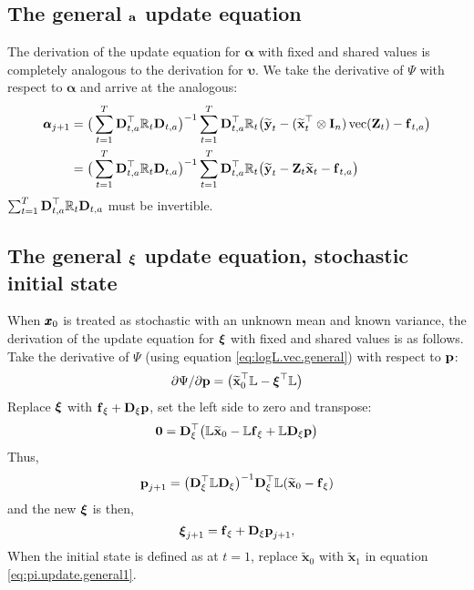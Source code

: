 \documentclass[]{article}
\def\uupsilon{\pmb{\upsilon}}
\def\aalpha{\pmb{\alpha}}
\def\xixi{\mbox{\boldmath $\xi$}}
\def\LAMm{\mathbb{L}}
\def\XI{\mbox{\boldmath $\Xi$}}
\def\DD{\mbox{$\mathbf D$}}	\def\dd{\mbox{$\mathbf d$}}
\def\II{\mbox{$\mathbf I$}} \def\ii{\mbox{$\mathbf i$}}
\def\ZZ{\mbox{$\mathbf Z$}}	\def\zz{\mbox{$\mathbf z$}}	\def\Zb{\mbox{$\mathbf M$}} \def\Za{\mbox{$\mathbf N$}} \def\Zm{\XI}
\def\vec{\,\textup{\textrm{vec}}}
\def\hatxt{\widetilde{\mbox{$\mathbf x$}}_t}
\def\hatyt{\widetilde{\mbox{$\mathbf y$}}_t}
\begin{document}
\subsection{The general $\aa$ update equation}\label{sec:constA}
The derivation of the update equation for $\aalpha$ with fixed and shared values is completely analogous to the derivation for $\uupsilon$. We take the derivative of $\Psi$ with respect to $\aalpha$ and arrive at the analogous:
\begin{equation}\label{eq:general.a.update}
\begin{split}
\aalpha_{j+1} &= \big(\sum_{t=1}^T \DD_{t,a}^\top\Rm_t\DD_{t,a} \big)^{-1}
  \sum_{t=1}^T \DD_{t,a}^\top\Rm_t\big(\hatyt- (\hatxt^\top \otimes \II_n)\vec(\ZZ_t) - \ff_{t,a} \big) \\
  &= \big(\sum_{t=1}^T \DD_{t,a}^\top\Rm_t\DD_{t,a} \big)^{-1}
  \sum_{t=1}^T \DD_{t,a}^\top\Rm_t\big(\hatyt- \ZZ_t\hatxt - \ff_{t,a} \big)
\end{split}
\end{equation}
$\sum_{t=1}^T \DD_{t,a}^\top\Rm_t\DD_{t,a}$ must be invertible.

\subsection{The general $\xixi$ update equation, stochastic initial state}
When $\xx_0$ is treated as stochastic with an unknown mean and known variance, the derivation of the update equation for $\xixi$ with fixed and shared values is as follows. Take the derivative of $\Psi$ (using equation \ref{eq:logL.vec.general}) with respect to $\pp$:
\begin{equation}\label{eq:pi.general1}
\partial\Psi/\partial\pp =  
\big(\widetilde{\mbox{$\mathbf x$}}_0^\top \LAMm - \xixi^\top\LAMm \big)
\end{equation}
Replace $\xixi$ with $\ff_\xi + \DD_\xi\pp$, set the left side to zero and transpose:
\begin{equation}\label{eq:pi.general2}
\mathbf{0} = 
\DD_\xi^\top\big(\LAMm\widetilde{\mbox{$\mathbf x$}}_0 - \LAMm\ff_\xi + \LAMm\DD_\xi\pp \big) 
\end{equation}
Thus,
\begin{equation}\label{eq:pi.update.general1}
\pp_{j+1} = \big(\DD_\xi^\top\LAMm\DD_\xi \big)^{-1}
\DD_\xi^\top\LAMm(\widetilde{\mbox{$\mathbf x$}}_0 - \ff_\xi)
\end{equation}
and the new $\xixi$ is then,
\begin{equation}\label{eq:pi.update.general2}
\xixi_{j+1} = \ff_\xi + \DD_\xi\pp_{j+1},
\end{equation}
When the initial state is defined as at $t=1$, replace $\widetilde{\mbox{$\mathbf x$}}_0$ with $\widetilde{\mbox{$\mathbf x$}}_1$ in equation \ref{eq:pi.update.general1}.
\end{document}
